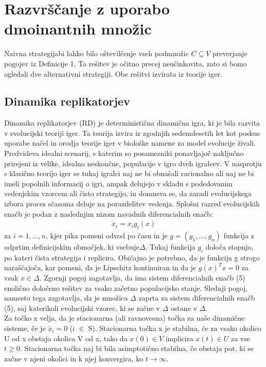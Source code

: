 \documentclass[a4paper]{article}
\begin{document}
\section{Razvrščanje z uporabo dmoinantnih množic}
Naivna strategijabi lahko bilo oštevilčenje vseh podmnožic $C\subseteq V$ preverjanje pogojev iz Definicije 1. Ta rešitev je očitno precej neučinkovita, zato si bomo ogledali dve alternativni strategiji. Obe rešitvi izvirata iz teorije iger.

\subsection{Dinamika replikatorjev}
Dinamika replikatorjev (RD) je deterministična dinamična igra, ki je bila razvita v evolucijski teoriji iger. Ta teorija izvira iz zgodnjih sedemdesetih let kot poskus uporabe načel in orodja teorije iger v biološke namene za model evolucije živali. Predvideva idealni scenarij, s katerim so posamezniki ponavljajoč naključno prirejeni iz velike, idealno neskončne, populacije v igro dveh igralcev. V nasprotju s klasično teorijo iger se tukaj igralci naj ne bi obnašali racionalno ali naj ne bi imeli popolnih informacij o igri, ampak delujejo v skladu s podedovanim vedenjskim vzorcem ali čisto strategijo, in domneva se, da zaradi evolucijskega izbora proces sčasoma deluje na porazdelitev vedenja. Splošni razred evolucijskih enačb je podan z naslednjim nizom navadnih diferencialnih enačb:
\begin{gather}
\dot{x}_i = x_i g_i (x)
\end{gather}
za $i = 1,\ldots,n$, kjer pika pomeni odvod po času in je $g = (g_1,\ldots, g_n)$ funkcija z odprtim definicijskim območjek, ki vsebuje$\Delta$. Tukaj funkcija $g_i$ določa stopnjo, po kateri čista strategija i replicira. Običajno je potrebno, da je funkcija g strogo naraščajoča, kar pomeni, da je Lipschitz kontinuiran in da je $g(x)^Tx = 0$ za vsak $x\in \Delta$. Zgornji pogoj zagotavlja, da ima sistem diferencialnih enačb (5) enolično določeno rešitev za vsako začetno populacijsko stanje. Slednji pogoj, namesto tega zagotavlja, da je množica $\Delta$ zaprta za sistem diferencialnih enačb (5), saj katerikoli evolucijski vzorec, ki se začne v $\Delta$ ostane v $\Delta$.\\
Za točko x velja, da je stacionarna (ali ravnovesna) točka za naše dinamične sisteme, če je $\dot{x}_i = 0$ (i $\in$ S). Stacionarna točka x je stabilna, če za vsako okolico U od x obstaja okolica V od x, tako da $x(0) \in V$ implicira $x(t) \in U$ za vse $t \geq 0$. Stacionarna točka naj bi bila asimptotično stabilna, če obstaja pot, ki se začne v njeni okolici in k njej konvergira, ko $t\rightarrow\infty$.\\
\end{document}
